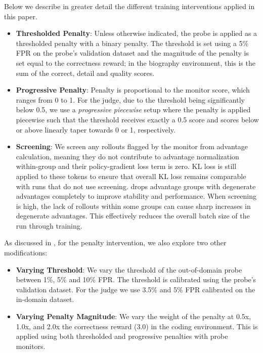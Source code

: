 \documentclass{article}
\begin{document}
Below we describe in greater detail the different training interventions applied in this paper. 
\begin{itemize}
    \item \textbf{Thresholded Penalty}: Unless otherwise indicated, the probe is applied as a thresholded penalty with a binary penalty. The threshold is set using a 5\% FPR on the probe's validation dataset and the magnitude of the penalty is set equal to the correctness reward; in the biography environment, this is the sum of the correct, detail and quality scores. 
    \item \textbf{Progressive Penalty}: Penalty is proportional to the monitor score, which ranges from 0 to 1. For the judge, due to the threshold being significantly below 0.5, we use a \emph{progressive piecewise} setup where the penalty is applied piecewise such that the threshold receives exactly a 0.5 score and scores below or above linearly taper towards 0 or 1, respectively. 
    \item \textbf{Screening}: We screen any rollouts flagged by the monitor from advantage calculation, meaning they do not contribute to advantage normalization within-group and their policy-gradient loss term is zero. KL loss is still applied to these tokens to ensure that overall KL loss remains comparable with runs that do not use screening. \cite{yu2025dapo} drops advantage groups with degenerate advantages completely to improve stability and performance. When screening is high, the lack of rollouts within some groups can cause sharp increases in degenerate advantages. This effectively reduces the overall batch size of the run through training.
\end{itemize}

As discussed in , for the penalty intervention, we also explore two other modifications:
\begin{itemize}
    \item \textbf{Varying Threshold}: We vary the threshold of the out-of-domain probe between 1\%, 5\% and 10\% FPR. The threshold is calibrated using the probe's validation dataset. For the judge we use 3.5\% and 5\% FPR calibrated on the in-domain dataset.
    \item \textbf{Varying Penalty Magnitude}: We vary the weight of the penalty at 0.5x, 1.0x, and 2.0x the correctness reward (3.0) in the coding environment. This is applied using both thresholded and progressive penalties with probe monitors.
\end{itemize}
\end{document}
